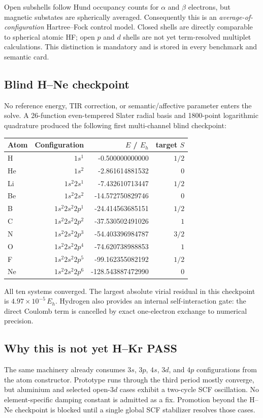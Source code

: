 Open subshells follow Hund occupancy counts for $\alpha$ and $\beta$ electrons, but magnetic substates are spherically averaged.  Consequently this is an \emph{average-of-configuration} Hartree--Fock control model.  Closed shells are directly comparable to spherical atomic HF; open $p$ and $d$ shells are not yet term-resolved multiplet calculations.  This distinction is mandatory and is stored in every benchmark and semantic card.

\subsection{Blind H--Ne checkpoint}
No reference energy, TIR correction, or semantic/affective parameter enters the solve.  A 26-function even-tempered Slater radial basis and 1800-point logarithmic quadrature produced the following first multi-channel blind checkpoint:

\begin{center}
\begin{tabular}{lrrr}
\hline
Atom & Configuration & $E$ / $E_h$ & target $S$\\
\hline
H  & $1s^1$                 & -0.500000000000 & $1/2$\\
He & $1s^2$                 & -2.861614881532 & $0$\\
Li & $1s^2 2s^1$            & -7.432610713447 & $1/2$\\
Be & $1s^2 2s^2$            & -14.572750829746 & $0$\\
B  & $1s^2 2s^2 2p^1$       & -24.414563685151 & $1/2$\\
C  & $1s^2 2s^2 2p^2$       & -37.530502491026 & $1$\\
N  & $1s^2 2s^2 2p^3$       & -54.403396984787 & $3/2$\\
O  & $1s^2 2s^2 2p^4$       & -74.620738988853 & $1$\\
F  & $1s^2 2s^2 2p^5$       & -99.162355082192 & $1/2$\\
Ne & $1s^2 2s^2 2p^6$       & -128.543887472990 & $0$\\
\hline
\end{tabular}
\end{center}

All ten systems converged.  The largest absolute virial residual in this checkpoint is $4.97\times10^{-5}\,E_h$.  Hydrogen also provides an internal self-interaction gate: the direct Coulomb term is cancelled by exact one-electron exchange to numerical precision.

\subsection{Why this is not yet H--Kr PASS}
The same machinery already consumes $3s$, $3p$, $4s$, $3d$, and $4p$ configurations from the atom constructor.  Prototype runs through the third period mostly converge, but aluminium and selected open-$3d$ cases exhibit a two-cycle SCF oscillation.  No element-specific damping constant is admitted as a fix.  Promotion beyond the H--Ne checkpoint is blocked until a single global SCF stabilizer resolves those cases.

